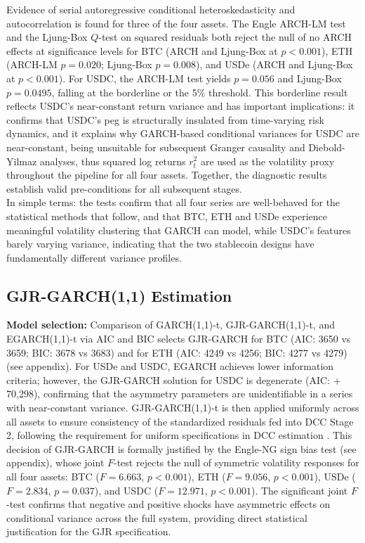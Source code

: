 \documentclass[12pt,a4paper,titlepage,oneside,english]{article}
\begin{document}
Evidence of serial autoregressive conditional heteroskedasticity and autocorrelation is found for three of the four assets.
The Engle ARCH-LM test and the Ljung-Box $Q$-test on squared residuals both reject
the null of no ARCH effects at significance levels for BTC
(ARCH and Ljung-Box at $p < 0.001$), ETH (ARCH-LM $p = 0.020$; Ljung-Box $p = 0.008$), and USDe
(ARCH and Ljung-Box at $p < 0.001$). For USDC, the ARCH-LM test yields $p = 0.056$ and Ljung-Box $p = 0.0495$, falling at the borderline or the 5\% threshold. This borderline result reflects USDC's
near-constant return variance and has important implications: it confirms that
USDC's peg is structurally insulated from time-varying risk dynamics, and it
explains why GARCH-based conditional variances for USDC are near-constant,
being unsuitable for subsequent Granger causality
and Diebold-Yilmaz analyses, thus squared log returns $r_t^2$ are used
as the volatility proxy throughout the  pipeline for all four
assets. Together, the diagnostic results establish valid pre-conditions for all
subsequent stages.\\
In simple terms: the tests confirm that all four series are well-behaved for
the statistical methods that follow, and that BTC, ETH and USDe experience meaningful
volatility clustering that GARCH can model, while USDC's features barely varying variance, indicating that the two stablecoin designs have fundamentally different variance profiles.

\subsection{GJR-GARCH(1,1) Estimation}
\textbf{Model selection:} Comparison of GARCH(1,1)-t, GJR-GARCH(1,1)-t, and
EGARCH(1,1)-t via AIC and BIC selects GJR-GARCH for BTC (AIC: 3650 vs 3659; BIC: 3678 vs 3683) and for ETH (AIC: 4249 vs 4256; BIC: 4277 vs 4279) (see appendix).
For USDe and USDC, EGARCH achieves lower information criteria; however, the
GJR-GARCH solution for USDC is degenerate (AIC: $+$70,298), confirming that the
asymmetry parameters are unidentifiable in a series with near-constant variance.
GJR-GARCH(1,1)-t is then applied uniformly across all assets to ensure
consistency of the standardized residuals fed into DCC Stage 2, following the
requirement for uniform specifications in DCC estimation \parencite{Engle01072002}.
This decision of GJR-GARCH is formally justified by the Engle-NG sign bias test (see appendix), whose joint
$F$-test rejects the null of symmetric volatility responses for all four assets:
BTC ($F = 6.663$, $p < 0.001$), ETH ($F = 9.056$, $p < 0.001$), USDe
($F = 2.834$, $p = 0.037$), and USDC ($F = 12.971$, $p < 0.001$). The
significant joint $F$-test confirms that negative and positive shocks have
asymmetric effects on conditional variance across the full system, providing direct
statistical justification for the GJR specification.\\
\end{document}
